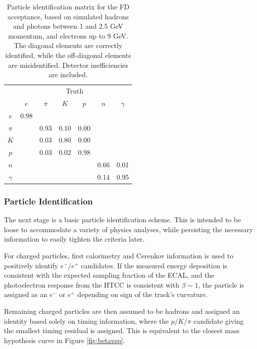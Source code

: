 \begin{table}[htpb]
  \begin{center}
    \begin{tabular}{|c|cccccc|}\hline
          & \multicolumn{6}{c|}{Truth}\\        
          & $e$  & $\pi$ & $K$  & $p$  & $n$  & $\gamma$ \\\hline
  $e$     & 0.98 &       &      &      &      &          \\ 
  $\pi$   &      &  0.93 & 0.10 & 0.00 &      &          \\ 
  $K$     &      &  0.03 & 0.80 & 0.00 &      &          \\ 
  $p$     &      &  0.03 & 0.02 & 0.98 &      &          \\ 
  $n$     &      &       &      &      & 0.66 &   0.01   \\ 
 $\gamma$ &      &       &      &      & 0.14 &   0.95   \\\hline 
    \end{tabular}  
  \caption{Particle identification matrix for the FD acceptance, based on simulated hadrons and photons between 1 and 2.5 GeV momentum, and electrons up to 9 GeV.  The diagonal elements are correctly identified, while the off-diagonal elements are misidentified.  Detector inefficiencies are included.}
  \label{table:pidmatrix}
  \end{center}
\end{table}

\subsubsection{Particle Identification}
The next stage is a basic particle identification scheme.  This is intended to be loose to accommodate a variety of physics analyses, while persisting the necessary information to easily tighten the criteria later.

For charged particles, first calorimetry and Cerenkov information is used to positively identify $e^-/e^+$ candidates.  If the measured energy deposition is consistent with the expected sampling fraction of the ECAL, and the photoelectron response from the HTCC is consistent with $\beta\sim1$, the particle is assigned as an $e^-$ or $e^+$ depending on sign of the track's curvature.

Remaining charged particles are then assumed to be hadrons and assigned an identity based solely on timing information, where the $p/K/\pi$ candidate giving the smallest timing residual is assigned.  This is equivalent to the closest mass hypothesis curve in Figure \ref{fig:betavsp}.

